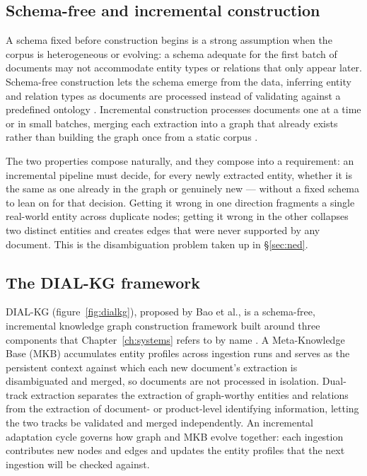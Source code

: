 \subsection{Schema-free and incremental construction}
\label{sec:schema-free-kgc}

A schema fixed before construction begins is a strong assumption when the corpus is heterogeneous or evolving: a schema adequate for the first batch of documents may not accommodate entity types or relations that only appear later. Schema-free construction lets the schema emerge from the data, inferring entity and relation types as documents are processed instead of validating against a predefined ontology \citep{carta2023iterative}. Incremental construction processes documents one at a time or in small batches, merging each extraction into a graph that already exists rather than building the graph once from a static corpus \citep{lairgi2024itext2kg}.

The two properties compose naturally, and they compose into a requirement: an incremental pipeline must decide, for every newly extracted entity, whether it is the same as one already in the graph or genuinely new — without a fixed schema to lean on for that decision. Getting it wrong in one direction fragments a single real-world entity across duplicate nodes; getting it wrong in the other collapses two distinct entities and creates edges that were never supported by any document. This is the disambiguation problem taken up in \S\ref{sec:ned}.

\subsection{The DIAL-KG framework}
\label{sec:dial-kg}

DIAL-KG (figure~\ref{fig:dialkg}), proposed by Bao et al., is a schema-free, incremental knowledge graph construction framework built around three components that Chapter~\ref{ch:systems} refers to by name \citep{bao2026dial}. A Meta-Knowledge Base (MKB) accumulates entity profiles across ingestion runs and serves as the persistent context against which each new document's extraction is disambiguated and merged, so documents are not processed in isolation. Dual-track extraction separates the extraction of graph-worthy entities and relations from the extraction of document- or product-level identifying information, letting the two tracks be validated and merged independently. An incremental adaptation cycle governs how graph and MKB evolve together: each ingestion contributes new nodes and edges and updates the entity profiles that the next ingestion will be checked against.

